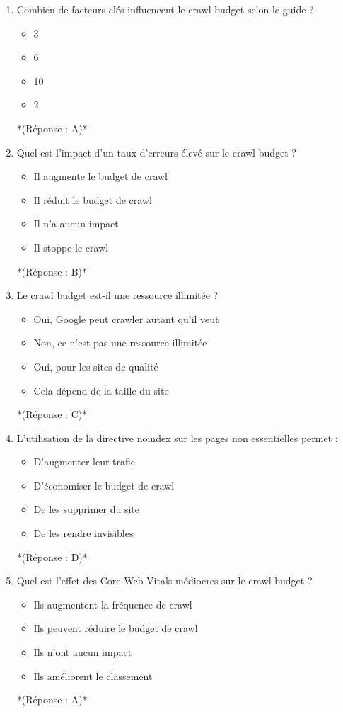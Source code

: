 \documentclass[12pt,a4paper,twoside]{report}
\begin{document}
\begin{enumerate}
\item Combien de facteurs clés influencent le crawl budget selon le guide ?
\begin{itemize}
\item[A)] 3
\item[B)] 6
\item[C)] 10
\item[D)] 2
\end{itemize}
*(Réponse : A)*

\item Quel est l'impact d'un taux d'erreurs élevé sur le crawl budget ?
\begin{itemize}
\item[A)] Il augmente le budget de crawl
\item[B)] Il réduit le budget de crawl
\item[C)] Il n'a aucun impact
\item[D)] Il stoppe le crawl
\end{itemize}
*(Réponse : B)*

\item Le crawl budget est-il une ressource illimitée ?
\begin{itemize}
\item[A)] Oui, Google peut crawler autant qu'il veut
\item[B)] Non, ce n'est pas une ressource illimitée
\item[C)] Oui, pour les sites de qualité
\item[D)] Cela dépend de la taille du site
\end{itemize}
*(Réponse : C)*

\item L'utilisation de la directive noindex sur les pages non essentielles permet :
\begin{itemize}
\item[A)] D'augmenter leur trafic
\item[B)] D'économiser le budget de crawl
\item[C)] De les supprimer du site
\item[D)] De les rendre invisibles
\end{itemize}
*(Réponse : D)*

\item Quel est l'effet des Core Web Vitals médiocres sur le crawl budget ?
\begin{itemize}
\item[A)] Ils augmentent la fréquence de crawl
\item[B)] Ils peuvent réduire le budget de crawl
\item[C)] Ils n'ont aucun impact
\item[D)] Ils améliorent le classement
\end{itemize}
*(Réponse : A)*


\end{enumerate}
\end{document}
